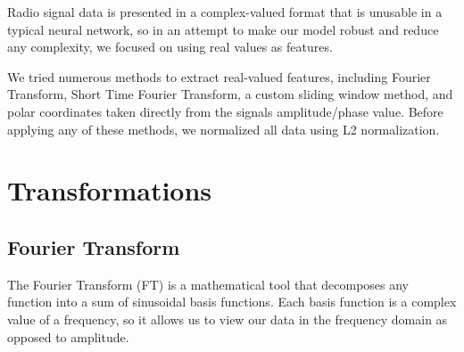 \documentclass{turabian-thesis}
\begin{document}
Radio signal data is presented in a complex-valued format that is unusable in a typical neural network, so in an attempt to make our model robust and reduce any complexity, we focused on using real values as features.

We tried numerous methods to extract real-valued features, including Fourier Transform, Short Time Fourier Transform, a custom sliding window method, and polar coordinates taken directly from the signals amplitude/phase value. Before applying any of these methods, we normalized all data using L2 normalization.





\section{Transformations}


\subsection{Fourier Transform}


The Fourier Transform (FT) is a mathematical tool that decomposes any function into a sum of sinusoidal basis functions. Each basis function is a complex value of a frequency, so it allows us to view our data in the frequency domain as opposed to amplitude.
\end{document}
